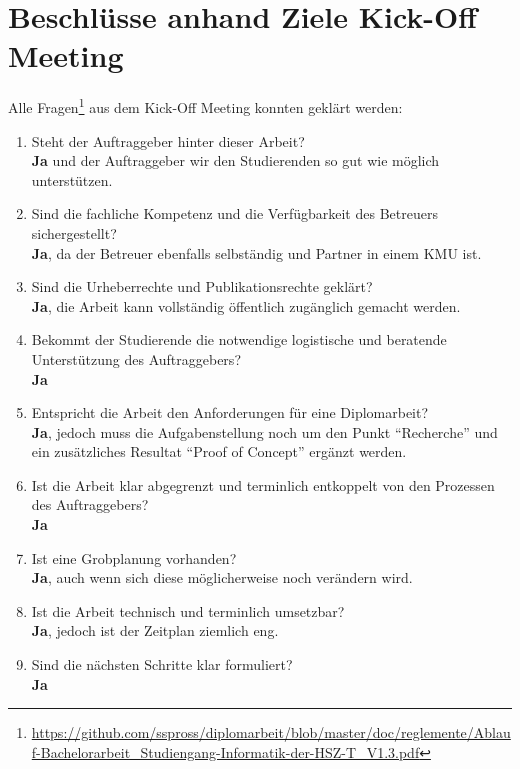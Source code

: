 \documentclass[]{scrreprt}
\begin{document}
    \section{Beschlüsse anhand Ziele Kick-Off Meeting}
    Alle Fragen\footnote{\url{https://github.com/sspross/diplomarbeit/blob/master/doc/reglemente/Ablauf-Bachelorarbeit_Studiengang-Informatik-der-HSZ-T_V1.3.pdf}} 
    aus dem Kick-Off Meeting konnten geklärt werden:
    \begin{enumerate}
        \item Steht der Auftraggeber hinter dieser Arbeit? \\
            {\bf Ja} und der Auftraggeber wir den Studierenden so gut wie
            möglich unterstützen.
        \item Sind die fachliche Kompetenz und die Verfügbarkeit des Betreuers 
            sichergestellt? \\
            {\bf Ja}, da der Betreuer ebenfalls selbständig und Partner in 
            einem KMU ist.
        \item Sind die Urheberrechte und Publikationsrechte geklärt? \\
            {\bf Ja}, die Arbeit kann vollständig öffentlich zugänglich gemacht
            werden.
        \item Bekommt der Studierende die notwendige logistische und beratende 
            Unterstützung des Auftraggebers? \\
            {\bf Ja}
        \item Entspricht die Arbeit den Anforderungen für eine Diplomarbeit? \\
            {\bf Ja}, jedoch muss die Aufgabenstellung noch um den Punkt 
            ``Recherche'' und ein zusätzliches Resultat ``Proof of Concept'' 
            ergänzt werden.
        \item Ist die Arbeit klar abgegrenzt und terminlich entkoppelt von den 
            Prozessen des Auftraggebers? \\
            {\bf Ja}
        \item Ist eine Grobplanung vorhanden? \\
            {\bf Ja}, auch wenn sich diese möglicherweise noch verändern wird.
        \item Ist die Arbeit technisch und terminlich umsetzbar? \\
            {\bf Ja}, jedoch ist der Zeitplan ziemlich eng.
        \item Sind die nächsten Schritte klar formuliert? \\
            {\bf Ja}
    \end{enumerate}
    
\end{document}
